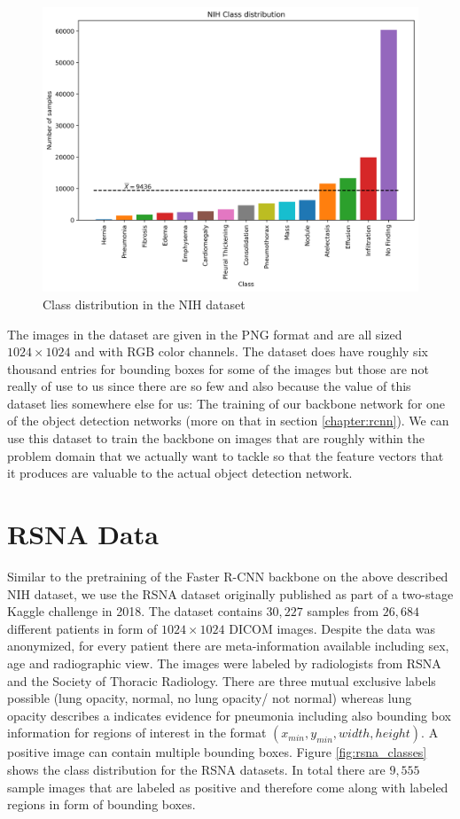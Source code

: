 \begin{figure}
	\centering
	\includegraphics[width=.8\linewidth]{img/nih_class_distribution.png}
	\caption{Class distribution in the NIH dataset}
	\label{fig:nih_classes}
\end{figure}

The images in the dataset are given in the PNG format and are all sized $1024 \times 1024$ and with RGB color channels. The dataset does have roughly six thousand entries for bounding boxes for some of the images but those are not really of use to us since there are so few and also because the value of this dataset lies somewhere else for us: The training of our backbone network for one of the object detection networks (more on that in section \vref{chapter:rcnn}). We can use this dataset to train the backbone on images that are roughly within the problem domain that we actually want to tackle so that the feature vectors that it produces are valuable to the actual object detection network. 

\section{RSNA Data}\label{data:rsna}

Similar to the pretraining of the Faster \ac{R-CNN} backbone on the above described NIH dataset, we use the RSNA dataset \autocite{RSNAKaeggle} originally published as part of a two-stage Kaggle challenge in 2018. The dataset contains $30,227$ samples from $26,684$ different patients in form of $1024 \times 1024$ DICOM images. Despite the data was anonymized, for every patient there are meta-information available including sex, age and radiographic view. The images were labeled by radiologists from \ac{RSNA} and the Society of Thoracic Radiology. There are three mutual exclusive  labels possible (lung opacity, normal, no lung opacity/ not normal) whereas lung opacity describes a indicates evidence for pneumonia including also bounding box information for regions of interest in the format $(x_{min}, y_{min}, width, height)$. A positive image can contain multiple bounding boxes. Figure \ref{fig:rsna_classes} shows the class distribution for the \ac{RSNA} datasets. In total there are $9,555$ sample images that are labeled as positive and therefore come along with labeled regions in form of bounding boxes.

